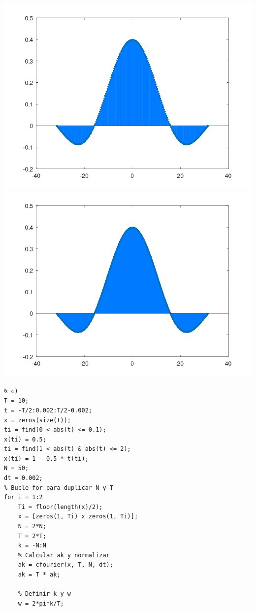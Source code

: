 \documentclass{article}
\begin{document}
\begin{enumerate}[leftmargin=*]
\begin{enumerate}[label=\roman*)]
\begin{center}
\includegraphics[width=0.45\linewidth]{"Imágenes/Figura24"}
\includegraphics[width=0.45\linewidth]{"Imágenes/Figura25"}
\end{center}

\begin{lstlisting}
% c)
T = 10;
t = -T/2:0.002:T/2-0.002;
x = zeros(size(t));
ti = find(0 < abs(t) <= 0.1);
x(ti) = 0.5;
ti = find(1 < abs(t) & abs(t) <= 2);
x(ti) = 1 - 0.5 * t(ti);
N = 50;
dt = 0.002;
% Bucle for para duplicar N y T
for i = 1:2
    Ti = floor(length(x)/2);
    x = [zeros(1, Ti) x zeros(1, Ti)];
    N = 2*N;
    T = 2*T;
    k = -N:N
    % Calcular ak y normalizar
    ak = cfourier(x, T, N, dt);
    ak = T * ak;

    % Definir k y w
    w = 2*pi*k/T;


\end{lstlisting}
\end{enumerate}
\end{enumerate}
\end{document}
